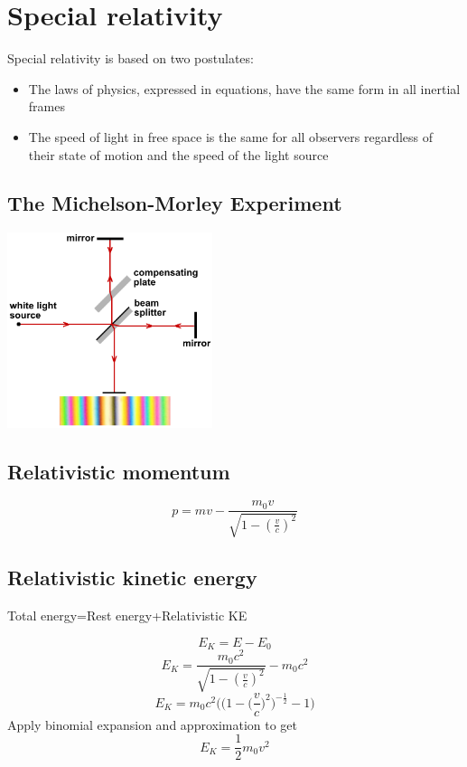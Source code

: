 \documentclass[12pt]{article}
\begin{document}
\section{Special relativity}
Special relativity is based on two postulates:
\begin{itemize}
\item The laws of physics, expressed in equations, have the same form in all inertial frames
\item The speed of light in free space is the same for all observers regardless of their state of motion and the speed of the light source
\end{itemize}
\subsection{The Michelson-Morley Experiment}
\includegraphics[width=6cm]{michelson.png}
\subsection{Relativistic momentum}
$$p=mv-\frac{m_0v}{\sqrt{1-(\frac{v}{c})^2}}$$
\subsection{Relativistic kinetic energy}
\begin{center}
Total energy=Rest energy+Relativistic KE
\end{center}
$$E_K=E-E_0$$
$$E_K=\frac{m_0c^2}{\sqrt{1-(\frac{v}{c})^2}}-m_0c^2$$
$$E_K=m_0c^2\Bigg(\bigg(1-\bigg(\frac{v}{c}\bigg)^2\bigg)^{-\frac{1}{2}}-1\Bigg)$$
Apply binomial expansion and approximation to get
$$E_K=\frac{1}{2}m_0v^2$$
\end{document}
